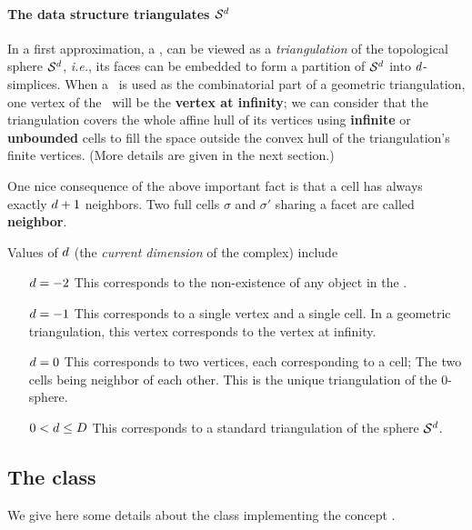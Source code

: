 \paragraph{The data structure triangulates $\mathcal S^{d}$}

In a first approximation,
a \tds, can be viewed as
a \emph{triangulation} of the topological sphere $\mathcal S^{d}$,
\emph{i.e.}, its faces can be embedded to form a partition of $\mathcal S^{d}$ into $d$-simplices. When a
\tds\ is used as the combinatorial part of a geometric triangulation, one
vertex of the \tds\ will be the \textbf{vertex at
infinity}; we can consider that the triangulation covers the whole
affine hull of its vertices
using \textbf{infinite} or \textbf{unbounded} cells to fill the space  outside the convex
hull of the triangulation's finite vertices. (More details are given in the next section.)


One nice consequence of the above important fact is that a cell has
always exactly  $d+1$ neighbors.
Two  full cells $\sigma$ and $\sigma'$ sharing a facet are called
\textbf{neighbor}.


Values of $d$ (the \emph{current dimension} of the complex) include
\begin{itemize}
\item[$d=-2$] This corresponds to the non-existence of any object in
  the \tds.
\item[$d=-1$] This corresponds to a single vertex and a single cell. In a
geometric triangulation, this vertex corresponds to the vertex at infinity.
\item[$d=0$] This corresponds to two vertices, each corresponding to
  a cell;
The two cells being neighbor of each other. This is the unique
triangulation of the $0$-sphere.
\item[$0<d\le D$] This corresponds to a standard triangulation of
the sphere $\mathcal S^{d}$.
\end{itemize}


\subsection{The class \label{triangulation:tds:impl}}

We give here some details about the class
implementing the concept .


